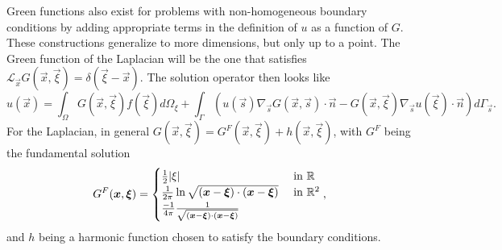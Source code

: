 Green functions also exist for problems with non-homogeneous boundary conditions by adding appropriate terms in the definition of $u$ as a function of $G$. These constructions generalize to more dimensions, but only up to a point. The Green function of the Laplacian will be the one that satisfies $\mathcal{L}_{\vec{x}}G(\vec{x},\vec{\xi})=\delta(\vec{\xi}-\vec{x})$. The solution operator then looks like
\begin{equation*}
    u(\vec{x})=\int_{\Omega}G(\vec{x},\vec{\xi})f(\vec{\xi})d\Omega_{\xi}+\int_{\Gamma}(u(\vec{s})\nabla_{\vec{s}}G(\vec{x},\vec{s})\cdot\vec{n}-G(\vec{x},\vec{\xi})\nabla_{\vec{s}}u(\vec{\xi})\cdot\vec{n})d\Gamma_{\vec{s}}.
\end{equation*}
For the Laplacian, in general $G(\vec{x},\vec{\xi})=G^{F}(\vec{x},\vec{\xi})+h(\vec{x},\vec{\xi})$, with $G^F$ being the fundamental solution 
\begin{equation*}
    G^F(\vec x, \vec\xi) = \begin{cases}
        \frac{1}{2}|\xi|&\text{ in }\R\\
        \frac{1}{2\pi}\ln\sqrt{(\vec x -\vec \xi)\cdot(\vec x - \vec \xi)} &\text{ in }\R^2\\
        \frac{-1}{4\pi} \frac{1}{\sqrt{(\vec x -\vec \xi)\cdot(\vec x - \vec \xi)}}
    \end{cases},
\end{equation*}
and $h$ being a harmonic function chosen to satisfy the boundary conditions.